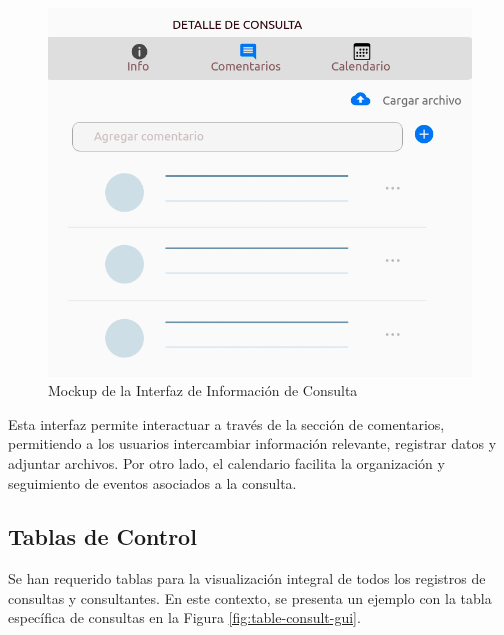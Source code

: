 \begin{figure}[H]
\centering
\includegraphics[width=1\linewidth]{fig/comment-gui.png}
\caption{Mockup de la Interfaz de Información de Consulta}
\label{fig:info-consult-gui}
\end{figure}

Esta interfaz permite interactuar a través de la sección de comentarios, permitiendo a los usuarios intercambiar información relevante, registrar datos y adjuntar archivos. Por otro lado, el calendario facilita la organización y seguimiento de eventos asociados a la consulta.

\subsection{Tablas de Control}

Se han requerido tablas para la visualización integral de todos los registros de consultas y consultantes. En este contexto, se presenta un ejemplo con la tabla específica de consultas en la Figura \ref{fig:table-consult-gui}.

